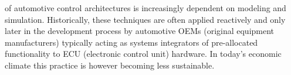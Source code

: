 
% 
% 
% 
% 

 of automotive control architectures is increasingly dependent on %
modeling and simulation. %
Historically, these techniques are often applied reactively and only later in the development process by automotive OEMs (original equipment manufacturers) typically acting %
as systems  integrators of pre-allocated functionality to  ECU (electronic control unit) hardware. 
In today's economic climate this practice is however becoming less sustainable. 
 
